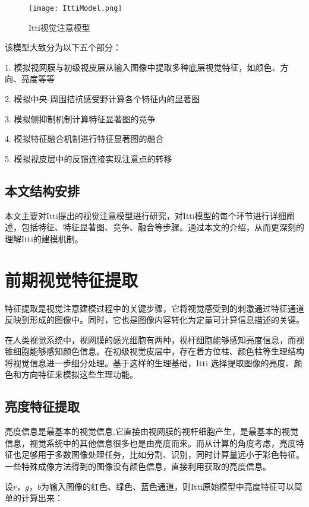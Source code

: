 \documentclass[a4paper,10pt]{article}\large
\begin{document}
\begin{figure}[!htb]
\centering
\texttt{[image: IttiModel.png]}
\caption{Itti视觉注意模型}\label{fig:1} 
\end{figure}


该模型大致分为以下五个部分：

1. 模拟视网膜与初级视皮层从输入图像中提取多种底层视觉特征，如颜色、方向、亮度等等


2. 模拟中央-周围拮抗感受野计算各个特征内的显著图


3. 模拟侧抑制机制计算特征显著图的竞争


4. 模拟特征融合机制进行特征显著图的融合


5. 模拟视皮层中的反馈连接实现注意点的转移


\subsection{本文结构安排}
本文主要对Itti提出的视觉注意模型进行研究，对Itti模型\cite{2:article}的每个环节进行详细阐述，包括特征、特征显著图、竞争、融合等步骤。通过本文的介绍，从而更深刻的理解Itti的建模机制。


\section{前期视觉特征提取}

特征提取是视觉注意建模过程中的关键步骤，它将视觉感受到的刺激通过特征通道反映到形成的图像中。同时，它也是图像内容转化为定量可计算信息描述的关键。

在人类视觉系统中，视网膜的感光细胞有两种，视杆细胞能够感知亮度信息，而视锥细胞能够感知颜色信息。在初级视觉皮层中，存在着方位柱、颜色柱等生理结构将视觉信息进一步细分处理。基于这样的生理基础，Itti 选择提取图像的亮度、颜色和方向特征来模拟这些生理功能。


\subsection{亮度特征提取}

亮度信息是最基本的视觉信息,它直接由视网膜的视杆细胞产生，是最基本的视觉信息，视觉系统中的其他信息很多也是由亮度而来。而从计算的角度考虑，亮度特征也足够用于多数图像处理任务，比如分割、识别，同时计算量远小于彩色特征。一些特殊成像方法得到的图像没有颜色信息，直接利用获取的亮度信息。


设$r$，$g$，$b$为输入图像的红色、绿色、蓝色通道，则Itti原始模型中亮度特征可以简单的计算出来：
\end{document}
